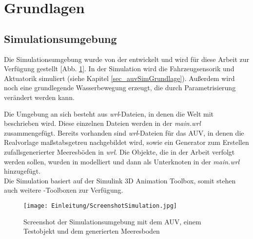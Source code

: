 \section{Grundlagen}
\subsection{Simulationsumgebung}
Die Simulationsumgebung wurde von der \atlas entwickelt und wird für diese Arbeit zur Verfügung gestellt [Abb. \ref{screenSim}].
In der Simulation wird die Fahrzeugsensorik und Aktuatorik simuliert (siehe Kapitel \ref{sec_auvSimGrundlage}). Außerdem wird noch eine grundlegende Wasserbewegung erzeugt, die durch Parametrisierung verändert werden kann.\\

Die Umgebung an sich besteht aus \textit{wrl}-Dateien, in denen die Welt mit \textit{\vrml} beschrieben wird. Diese einzelnen Dateien werden in der \textit{main.wrl} zusammengefügt. Bereits vorhanden sind \textit{wrl}-Dateien für das AUV, in denen die Realvorlage maßstabsgetreu nachgebildet wird, sowie ein Generator zum Erstellen zufallsgenerierter Meeresböden in \textit{wrl}. Die Objekte, die in der Arbeit verfolgt werden sollen, wurden in \textit{\vrml} modelliert und dann als Unterknoten in der \textit{main.wrl} hinzugefügt.\\
Die Simulation basiert auf der \matlab Simulink 3D Animation Toolbox, somit stehen auch weitere \matlab -Toolboxen zur Verfügung. 
\begin{figure}[H]
\texttt{[image: Einleitung/ScreenshotSimulation.jpg]}
\caption[Screenshot der Simulationsumgebung]{Screenshot der Simulationsumgebung mit dem AUV, einem Testobjekt und dem generierten Meeresboden}
\label{screenSim}
\end{figure}
